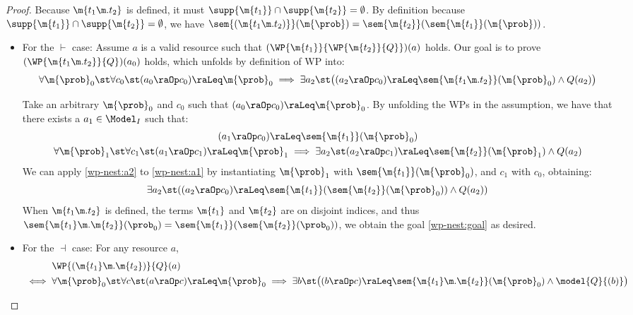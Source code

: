 \begin{proof}
  Because $\m{t_1 \m. t_2}$ is defined,
  it must $\supp{\m{t_1}} \cap \supp{\m{t_2}} = \emptyset$.
  By definition
because $\supp{\m{t_1}} \cap \supp{\m{t_2}} = \emptyset$,
  we have
$
    \sem{(\m{t_1 \m. t_2)}}(\m{\prob})
    = \sem{\m{t_2}} (\sem{\m{t_1}} (\m{\prob}))
  $.


  \begin{itemize}
    \item For the $\vdash$ case:
Assume $a$ is a valid resource such that
  $(\WP {\m{t_1}} {\WP {\m{t_2}} {Q}})(a)$ holds.
  Our goal is to prove $(\WP {\m{t_1 \m. t_2}} {Q})(a_0)$ holds,
  which unfolds by definition of WP into:
  \begin{equation}
    \forall \m{\prob}_0\st
    \forall c_0 \st
    (a_0 \raOp c_0) \raLeq \m{\prob}_0
    \implies
      \exists a_2 \st
      \bigl(
        (a_2 \raOp c_0) \raLeq \sem{\m{t_1 \m. t_2}}(\m{\prob}_0)
      \land Q(a_2)
      \bigr)
    \label{wp-nest:goal}
  \end{equation}

  Take an arbitrary $\m{\prob}_0$ and $c_0$ such that
  $ (a_0 \raOp c_0) \raLeq \m{\prob}_0 $.
  By unfolding the WPs in the assumption,
  we have that there exists a
  $a_1 \in \Model_I$ such that:
  \begin{gather}
    (a_1 \raOp c_0) \raLeq \sem{\m{t_1}}(\m{\prob}_0)
    \label{wp-nest:a1}
    \\
    \forall \m{\prob}_1\st
    \forall c_1 \st
      (a_1 \raOp c_1) \raLeq \m{\prob}_1
      \implies
      \exists a_2 \st
      (a_2 \raOp c_1) \raLeq \sem{\m{t_2}}(\m{\prob}_1)
      \land  Q(a_2)
    \label{wp-nest:a2}
  \end{gather}
  We can apply \eqref{wp-nest:a2} to \eqref{wp-nest:a1}
  by instantiating $\m{\prob}_1$ with $\sem{\m{t_1}}(\m{\prob}_0)$,
  and $c_1$ with $c_0$,
  obtaining:
  \[
    \exists a_2 \st
    ((a_2 \raOp c_0) \raLeq \sem{\m{t_1}}(\sem{\m{t_2}}(\m{\prob}_0))
    \land  Q(a_2))
  \]
  When $\m{t_1 \m. t_2}$ is defined,
  the terms $\m{t_1}$ and $\m{t_2}$ are on disjoint indices,
  and thus
  $ \sem{ \m{t_1} \m. \m{t_2}}(\prob_0) = \sem{\m{t_1}}(\sem{\m{t_2}}(\prob_0)) $,
  we obtain the goal \eqref{wp-nest:goal} as desired.

    \item For the $\dashv$ case:
      For any resource $a$,
      \begin{align}
      &
      \WP {(\m{t_1} \m. \m{t_2})} {Q} (a) \notag \\
      {}\iff{} &
        \forall \m{\prob}_0 \st
        \forall c \st
        (a \raOp c) \raLeq \m{\prob}_0
        \implies
        \exists b \st
        \bigl(
          (b \raOp c) \raLeq \sem{\m{t_1} \m. \m{t_2}}(\m{\prob}_0)
          \land
          \model{Q}{(b)}
       \bigr)
       \label{helper:wp-nest:1}
      \end{align}


\end{itemize}
\end{proof}

